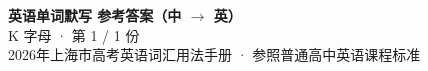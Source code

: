\documentclass[10pt,a4paper]{article}
\begin{document}
\pagestyle{plain}

\begin{center}
{\LARGE\bfseries 英语单词默写 \quad 参考答案（中 $\to$ 英）}\\[0.22em]
{\large K 字母 · 第 1 / 1 份}\\[0.18em]
{\small 2026年上海市高考英语词汇用法手册 · 参照普通高中英语课程标准}
\end{center}

\vspace{0.2em}
\noindent{\color{rulegray}\rule{\textwidth}{0.8pt}}

\vspace{0.35em}

\vspace{0.25em}
\renewcommand{\arraystretch}{1.32}
\end{document}
